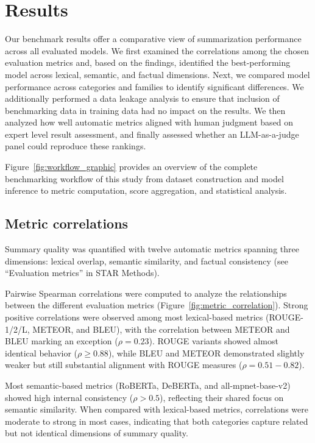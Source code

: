 \section{Results}

Our benchmark results offer a comparative view of summarization performance across all evaluated models. We first examined the correlations among the chosen evaluation metrics and, based on the findings, identified the best-performing model across lexical, semantic, and factual dimensions. Next, we compared model performance across categories and families to identify significant differences. We additionally performed a data leakage analysis to ensure that inclusion of benchmarking data in training data had no impact on the results. We then analyzed how well automatic metrics aligned with human judgment based on expert level result assessment, and finally assessed whether an \ac{LLM}-as-a-judge panel could reproduce these rankings.

Figure~\ref{fig:workflow_graphic} provides an overview of the complete benchmarking workflow of this study from dataset construction and model inference to metric computation, score aggregation, and statistical analysis.

\subsection{Metric correlations}

Summary quality was quantified with twelve automatic metrics spanning three dimensions: lexical overlap, semantic similarity, and factual consistency (see ``Evaluation metrics'' in STAR Methods).

Pairwise Spearman correlations were computed to analyze the relationships between the different evaluation metrics (Figure~\ref{fig:metric_correlation}). Strong positive correlations were observed among most lexical-based metrics (\ac{ROUGE}-1/2/L, \ac{METEOR}, and \ac{BLEU}), with the correlation between \ac{METEOR} and \ac{BLEU} marking an exception ($\rho = 0.23$). \ac{ROUGE} variants showed almost identical behavior ($\rho \geq 0.88$), while \ac{BLEU} and \ac{METEOR} demonstrated slightly weaker but still substantial alignment with \ac{ROUGE} measures ($\rho = 0.51 - 0.82$).

Most semantic-based metrics (\ac{RoBERTa}, \ac{DeBERTa}, and all-mpnet-base-v2) showed high internal consistency ($\rho > 0.5$), reflecting their shared focus on semantic similarity. When compared with lexical-based metrics, correlations were moderate to strong in most cases, indicating that both categories capture related but not identical dimensions of summary quality. 

